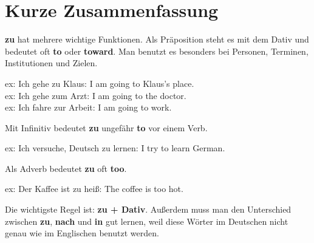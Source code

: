 \documentclass[a4paper,12pt]{article}
\begin{document}
    
    \section{Kurze Zusammenfassung}
        
        \textbf{zu} hat mehrere wichtige Funktionen. Als Präposition steht es mit dem Dativ und bedeutet oft \textbf{to} oder \textbf{toward}. Man benutzt es besonders bei Personen, Terminen, Institutionen und Zielen.
        
        ex: Ich gehe zu Klaus: I am going to Klaus's place.\\
        ex: Ich gehe zum Arzt: I am going to the doctor.\\
        ex: Ich fahre zur Arbeit: I am going to work.
        
        Mit Infinitiv bedeutet \textbf{zu} ungefähr \textbf{to} vor einem Verb.
        
        ex: Ich versuche, Deutsch zu lernen: I try to learn German.
        
        Als Adverb bedeutet \textbf{zu} oft \textbf{too}.
        
        ex: Der Kaffee ist zu heiß: The coffee is too hot.
        
        Die wichtigste Regel ist: \textbf{zu + Dativ}. Außerdem muss man den Unterschied zwischen \textbf{zu}, \textbf{nach} und \textbf{in} gut lernen, weil diese Wörter im Deutschen nicht genau wie im Englischen benutzt werden.
\end{document}
